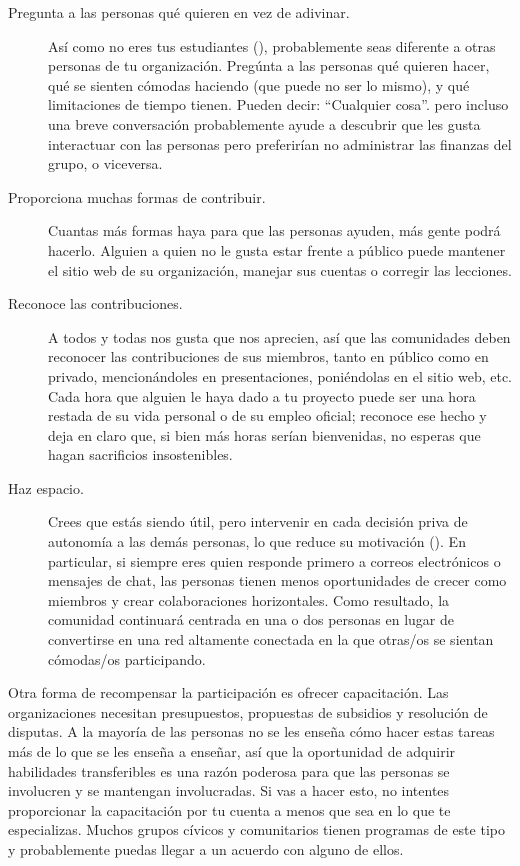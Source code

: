 \begin{description}

\item[Pregunta a las personas qué quieren en vez de adivinar.]
  Así como no eres tus estudiantes (),
  probablemente seas diferente a otras personas de tu organización.
  Pregúnta a las personas qué quieren hacer,
  qué se sienten cómodas haciendo (que puede no ser lo mismo),
  y qué limitaciones de tiempo tienen.
  Pueden decir: ``Cualquier cosa''.
  pero incluso una breve conversación probablemente ayude a descubrir que
  les gusta interactuar con las personas pero preferirían no administrar las finanzas del grupo,
  o viceversa.

\item[Proporciona muchas formas de contribuir.]
    Cuantas más formas haya para que las personas ayuden, más gente podrá hacerlo.
  Alguien a quien no le gusta estar frente a público
  puede mantener el sitio web de su organización,
  manejar sus cuentas
  o corregir las lecciones.

\item[Reconoce las contribuciones.]
  A todos y todas nos gusta que nos aprecien,
  así que las comunidades deben reconocer las contribuciones
  de sus miembros, tanto en público como en privado,
  mencionándoles en presentaciones,
  poniéndolas en el sitio web, etc.
  Cada hora que alguien le haya dado a tu proyecto
  puede ser una hora restada de su vida personal o de su empleo oficial;
  reconoce ese hecho
  y deja en claro que, si bien más horas serían bienvenidas,
  no esperas que hagan sacrificios insostenibles.

\item[Haz espacio.]
  Crees que estás siendo útil,
  pero intervenir en cada decisión priva de autonomía a las demás personas,
  lo que reduce su motivación ().
  En particular, si siempre eres quien responde primero a correos electrónicos o mensajes de chat,
  las personas tienen menos oportunidades de crecer como miembros
  y crear colaboraciones horizontales.
  Como resultado,
  la comunidad continuará centrada en una o dos personas
  en lugar de convertirse en una red altamente conectada
  en la que otras/os se sientan cómodas/os participando.

\end{description}

Otra forma de recompensar la participación es ofrecer capacitación.
Las organizaciones necesitan presupuestos, propuestas de subsidios y resolución de disputas.
A la mayoría de las personas no se les enseña cómo hacer estas tareas más de lo que se les enseña a enseñar,
así que la oportunidad de adquirir habilidades transferibles
es una razón poderosa para que las personas se involucren y se mantengan involucradas.
Si vas a hacer esto, no intentes proporcionar la capacitación por tu cuenta
a menos que sea en lo que te especializas.
Muchos grupos cívicos y comunitarios tienen programas de este tipo
y probablemente puedas llegar a un acuerdo con alguno de ellos.

